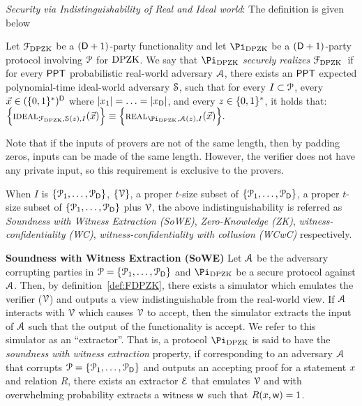 \noindent\textit{Security via Indistinguishability of Real and Ideal world}: The definition is given below
\begin{definition}\label{def:FDPZK}
Let $\mathcal{F}_{\text{DPZK}}$ be a $(\mathsf{D}+1)$-party  functionality and let $\Pi_{\DPZK}$ be a $(\mathsf{D}+1)$-party protocol involving $\mathcal{P}$ for $\text{DPZK}$. We say that  $\Pi_\DPZK$ {\em securely realizes} $\mathcal{F}_{\text{DPZK}}$~if for every $\mathsf{PPT}$ probabilistic  real-world adversary $\mathcal{A}$, there exists an $\mathsf{PPT}$  expected polynomial-time ideal-world adversary $\mathcal{S}$, such that for every $I \subset \mathcal{P}$, every $\vec{x} \in (\{0,1\}^*)^{\mathsf{D}}$ where $\left\lvert x_1 \right\rvert = \ldots= \left\lvert x_{\mathsf{D}} \right\rvert$, and every $z \in \{0,1\}^*$, it holds that:
	$\Big\{\Ideal_{\Func_{\DPZK}, \Sim(z),I}(\vec{x}) \Big\} \equiv \Big\{ \Real_{\Pi_\DPZK, \Adv(z),I}(\vec{x}) \Big\}. $

Note that if the inputs of provers are not of the same length, then by padding zeros, inputs can be made of the same length. However, the verifier does not have any private input, so this requirement is exclusive to the provers.



When $I$ is  $\{\mathcal{P}_1,\ldots,\mathcal{P}_{\mathsf{D}}\}$, $\{\mathcal{V}\}$, a proper $t$-size subset of $\{\mathcal{P}_1,\ldots,\mathcal{P}_{\mathsf{D}}\}$, a proper $t$-size subset of $\{\mathcal{P}_1,\ldots,\mathcal{P}_{\mathsf{D}}\}$ plus   $\mathcal{V}$, the above indistinguishability  is referred as {\em Soundness with Witness Extraction (SoWE)}, {\em Zero-Knowledge (ZK)}, {\em witness-confidentiality (WC)}, {\em witness-confidentiality with collusion (WCwC)} respectively.   	
\end{definition}


{\bf Soundness with Witness Extraction (SoWE)} Let $\mathcal{A}$ be the adversary corrupting parties in $\mathcal{P} = \{ \mathcal{P}_1, \ldots, \mathcal{P}_{\mathsf{D}}\}$ and $\Pi_\DPZK$ be a secure protocol against $\mathcal{A}$. Then, by definition~\ref{def:FDPZK}, there exists a simulator which emulates the verifier ($\mathcal{V}$) and outputs a view indistinguishable from the real-world view. If $\mathcal{A}$ interacts with $\mathcal{V}$ which causes $\mathcal{V}$ to accept, then the simulator extracts the input of $\mathcal{A}$ such that the output of the functionality is accept. We refer to this simulator as an ``extractor''. 
That is, a protocol $\Pi_{\DPZK}$ is said to have the \textit{soundness with witness extraction} property, if corresponding to an adversary $\mathcal{A}$ that corrupts $\mathcal{P} = \{\mathcal{P}_1, \ldots, \mathcal{P}_{\mathsf{D}}\}$ and outputs an accepting proof for a statement ${x}$ and relation $R$, there exists an extractor $\mathcal{E}$ that emulates $\mathcal{V}$ and with overwhelming probability extracts a witness $\mathsf{w}$ such that $R({x}, \mathsf{w}) = 1$.


